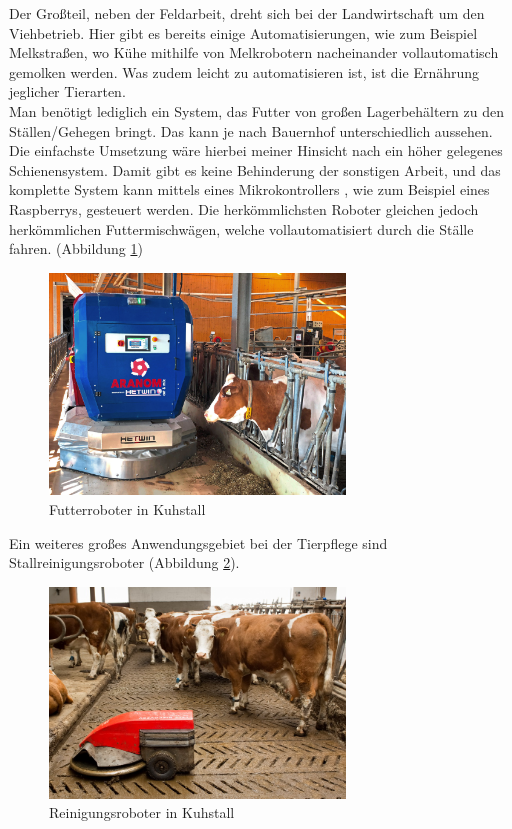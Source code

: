 Der Großteil, neben der Feldarbeit, dreht sich bei der Landwirtschaft um den
Viehbetrieb. Hier gibt es bereits einige Automatisierungen, wie zum Beispiel
Melkstraßen, wo Kühe mithilfe von Melkrobotern nacheinander vollautomatisch
gemolken werden. Was zudem leicht zu automatisieren ist, ist die Ernährung
jeglicher Tierarten.\\ Man benötigt lediglich ein System, das Futter von großen
Lagerbehältern zu den Ställen/Gehegen bringt. Das kann je nach Bauernhof
unterschiedlich aussehen. Die einfachste Umsetzung wäre hierbei meiner Hinsicht
nach ein höher gelegenes Schienensystem. Damit gibt es keine Behinderung der
sonstigen Arbeit, und das komplette System kann mittels eines
Mikrokontrollers , wie zum Beispiel eines Raspberrys, gesteuert werden. Die
herkömmlichsten Roboter gleichen jedoch herkömmlichen Futtermischwägen, welche
vollautomatisiert durch die Ställe fahren. (Abbildung \ref{fig:futterroboter})

\begin{figure}[ht]
    \centering
    \includegraphics[width=0.7\textwidth]{bilder/futterroboter.jpg}
    \caption[Futterroboter in Kuhstall]{Futterroboter in Kuhstall\cite{Futterroboter}}
    \label{fig:futterroboter}
\end{figure}

Ein weiteres großes Anwendungsgebiet bei der Tierpflege sind
Stallreinigungsroboter (Abbildung \ref{fig:rroboter}).

\begin{figure}[ht]
    \centering
    \includegraphics[width=0.7\textwidth]{bilder/Spaltenroboter_agrarfoto.com_.jpg}
    \caption[Reinigungsroboter in Kuhstall]{Reinigungsroboter in Kuhstall\cite{Reinigungsroboter}}
    \label{fig:rroboter}
\end{figure}

